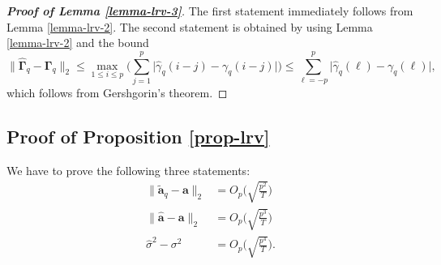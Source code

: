 \begin{proof}[\textnormal{\textbf{Proof of Lemma \ref{lemma-lrv-3}}}] 
The first statement immediately follows from Lemma \ref{lemma-lrv-2}. The second statement is obtained by using Lemma \ref{lemma-lrv-2} and the bound
\[ \| \widehat{\boldsymbol{\Gamma}}_q - \boldsymbol{\Gamma}_q \|_2 \le \max_{1 \le i \le p} \Big( \sum\limits_{j=1}^p \big| \widehat{\gamma}_q(i-j) - \gamma_q(i-j) \big| \Big) \le \sum\limits_{\ell=-p}^p \big| \widehat{\gamma}_q(\ell) - \gamma_q(\ell) \big|, \]
which follows from Gershgorin's theorem. 
\end{proof}



\subsection*{Proof of Proposition \ref{prop-lrv}}


We have to prove the following three statements: 
\begin{align}
\| \widetilde{\boldsymbol{a}}_q - \boldsymbol{a} \|_2 & = O_p\Big( \sqrt{\frac{p^2}{T}} \Big) \label{prop-lrv-statement1} \\ 
\| \widehat{\boldsymbol{a}} - \boldsymbol{a} \|_2 & = O_p\Big( \sqrt{\frac{p^3}{T}} \Big) \label{prop-lrv-statement2} \\
\widehat{\sigma}^2 - \sigma^2 & = O_p\Big(  \sqrt{\frac{p^4}{T}} \Big). \label{prop-lrv-statement3}
\end{align} 


